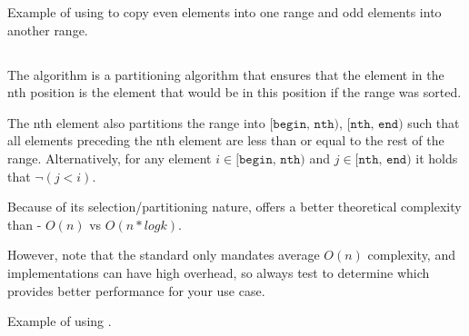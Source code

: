 \begin{codebox}[]{\href{https://compiler-explorer.com/z/nzrbczh4j}{\ExternalLink}}
\footnotesize Example of using  to copy even elements into one range and odd elements into another range.
\tcblower
{}
\end{codebox}

\subsection{\texorpdfstring{}{\texttt{std::nth\_element}}}

The  algorithm is a partitioning algorithm that ensures that the element in the nth position is the element that would be in this position if the range was sorted.

The nth element also partitions the range into $\texttt{[begin, nth)}$, $\texttt{[nth, end)}$ such that all elements preceding the nth element are less than or equal to the rest of the range. Alternatively, for any element $i \in \texttt{[begin, nth)}$ and $j \in \texttt{[nth, end)}$ it holds that $\neg (j < i)$.



Because of its selection/partitioning nature,  offers a better theoretical complexity than  - $O(n)$ vs $O(n*logk)$.

However, note that the standard only mandates average $O(n)$ complexity, and  implementations can have high overhead, so always test to determine which provides better performance for your use case.

\begin{codebox}[]{\href{https://compiler-explorer.com/z/n7T3h5sM8}{\ExternalLink}}
\footnotesize Example of using .
\tcblower
{}
\end{codebox}
